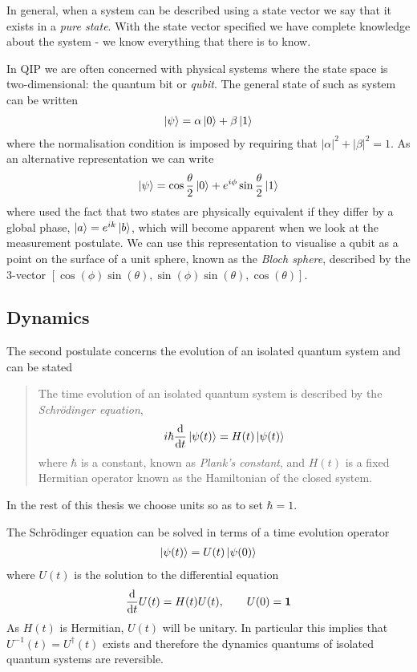 In general, when a system can be described using a state vector we say that it exists in a \textit{pure state}. With the state vector specified we have complete knowledge about the system - we know everything that there is to know.

In QIP we are often concerned with physical systems where the state space is two-dimensional: the quantum bit or \textit{qubit}. The general state of such as system can be written
\begin{align}
  \left\vert\psi\right\rangle = \alpha\left\vert0\right\rangle + \beta\left\vert1\right\rangle
\end{align}
where the normalisation condition is imposed by requiring that $|\alpha|^2 + |\beta|^2 = 1$. As an alternative representation we can write
\begin{align}
  \left\vert\psi\right\rangle = \cos\frac{\theta}{2}\left\vert0\right\rangle + e^{i\phi}\sin\frac{\theta}{2}\left\vert1\right\rangle
\end{align}
where used the fact that two states are physically equivalent if they differ by a global phase, $\left\vert a\right\rangle = e^{ik}\left\vert b\right\rangle$, which will become apparent when we look at the measurement postulate. We can use this representation to visualise a qubit as a point on the surface of a unit sphere, known as the \textit{Bloch sphere}, described by the $3$-vector $[\cos(\phi)\sin(\theta), \sin(\phi)\sin(\theta), \cos(\theta)]$.

\subsection{Dynamics}

The second postulate concerns the evolution of an isolated quantum system and can be stated
\begin{quotation}
The time evolution of an isolated quantum system is described by the \textit{Schr\"odinger equation},
\begin{align}
  \label{qd:schrodinger_eq}
  i\hbar\frac{\mathrm{d}}{\mathrm{d}t} \left\vert\psi(t)\right\rangle = H(t) \left\vert\psi(t)\right\rangle
\end{align}
where $\hbar$ is a constant, known as \textit{Plank's constant}, and $H(t)$ is a fixed Hermitian operator known as the Hamiltonian of the closed system.
\end{quotation}
In the rest of this thesis we choose units so as to set $\hbar = 1$. 

The Schr\"odinger equation can be solved in terms of a time evolution operator
\begin{align}
  \left\vert\psi(t)\right\rangle = U(t)\left\vert\psi(0)\right\rangle
\end{align}
where $U(t)$ is the solution to the differential equation
\begin{align}
  \frac{\mathrm{d}}{\mathrm{d}t} U(t) = H(t)U(t), \qquad U(0) = \mathbf{1}
\end{align}
As $H(t)$ is Hermitian, $U(t)$ will be unitary. In particular this implies that $U^{-1}(t) = U^\dagger(t)$ exists and therefore the dynamics quantums of isolated quantum systems are reversible.

